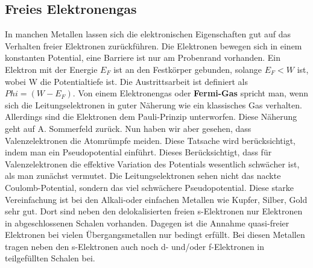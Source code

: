 \documentclass[11pt]{article}
\begin{document}
\subsection{Freies Elektronengas}
In manchen Metallen lassen sich die elektronischen Eigenschaften gut auf das
Verhalten freier Elektronen zurückführen. Die Elektronen bewegen sich in einem
konstanten Potential, eine Barriere ist nur am Probenrand vorhanden. Ein
Elektron mit der Energie $E_F$ ist an den Festkörper gebunden, solange $E_F<W$
ist, wobei W die Potentialtiefe ist. Die Austrittsarbeit ist definiert als
$Phi=(W-E_F)$. Von einem Elektronengas oder \textbf{Fermi-Gas} spricht man, wenn
sich die Leitungselektronen in guter Näherung wie ein klassisches Gas verhalten.
Allerdings sind die Elektronen dem Pauli-Prinzip unterworfen. Diese Näherung
geht auf A. Sommerfeld zurück. Nun haben wir aber gesehen, dass Valenzelektronen
die Atomrümpfe meiden. Diese Tatsache wird berücksichtigt, indem man ein
Pseudopotential einführt. Dieses Berücksichtigt, dass für Valenzelektronen die
effektive Variation des Potentials wesentlich schwächer ist, als man zunächst
vermutet. Die Leitungselektronen sehen nicht das nackte Coulomb-Potential,
sondern das viel schwächere Pseudopotential. Diese starke Vereinfachung ist bei
den Alkali-oder einfachen Metallen wie Kupfer, Silber, Gold sehr gut. Dort sind
neben den delokalisierten freien s-Elektronen nur Elektronen in abgeschlossenen
Schalen vorhanden. Dagegen ist die Annahme quasi-freier Elektronen bei vielen
Übergangsmetallen nur bedingt erfüllt. Bei diesen Metallen tragen neben den
s-Elektronen auch noch d- und/oder f-Elektronen in teilgefüllten Schalen bei.
\end{document}
